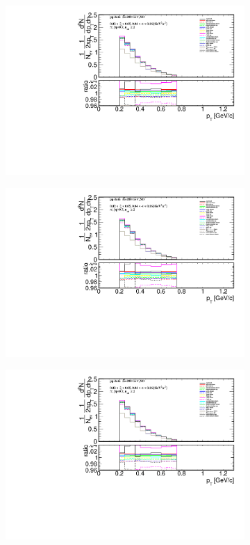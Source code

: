 \begin{figure}[h!]
	\centering
	\begin{subfigure}{.49\textwidth}
		\includegraphics[width=\textwidth,page=25]{chapters/chrgSTAR/img/syst/outPID_SDT.pdf}
	\end{subfigure}
	\begin{subfigure}{.49\textwidth}
		\includegraphics[width=\textwidth,page=26]{chapters/chrgSTAR/img/syst/outPID_SDT.pdf}
	\end{subfigure}
	\begin{subfigure}{.49\textwidth}
		\includegraphics[width=\textwidth,page=27]{chapters/chrgSTAR/img/syst/outPID_SDT.pdf}

\end{subfigure}
\end{figure}
